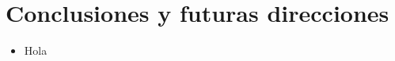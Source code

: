\documentclass[conference]{IEEEtran}
\begin{document}
\section{Conclusiones y futuras direcciones}
\label{sec:conclusions}

\begin{itemize}
\item Hola
\end{itemize}








\end{document}
